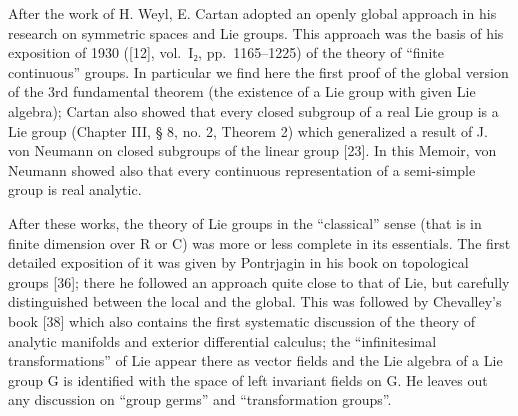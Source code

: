 After the work of H. Weyl, E. Cartan adopted an openly global approach in his research on symmetric spaces and Lie groups. This approach was the basis of his exposition of 1930 ({[}12{]}, vol.~I₂, pp.~1165--1225) of the theory of ``finite continuous'' groups. In particular we find here the first proof of the global version of the 3rd fundamental theorem (the existence of a Lie group with given Lie algebra); Cartan also showed that every closed subgroup of a real Lie group is a Lie group (Chapter III, § 8, no. 2, Theorem 2) which generalized a result of J. von Neumann on closed subgroups of the linear group {[}23{]}. In this Memoir, von Neumann showed also that every continuous representation of a semi-simple group is real analytic.

After these works, the theory of Lie groups in the ``classical'' sense (that is in finite dimension over R or C) was more or less complete in its essentials. The first detailed exposition of it was given by Pontrjagin in his book on topological groups {[}36{]}; there he followed an approach quite close to that of Lie, but carefully distinguished between the local and the global. This was followed by Chevalley's book {[}38{]} which also contains the first systematic discussion of the theory of analytic manifolds and exterior differential calculus; the ``infinitesimal transformations'' of Lie appear there as vector fields and the Lie algebra of a Lie group G is identified with the space of left invariant fields on G. He leaves out any discussion on ``group germs'' and ``transformation groups''.

